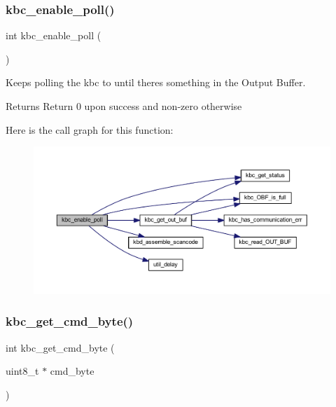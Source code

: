 \subsubsection{\texorpdfstring{kbc\+\_\+enable\+\_\+poll()}{kbc\_enable\_poll()}}
{\footnotesize\ttfamily int kbc\+\_\+enable\+\_\+poll (\begin{DoxyParamCaption}{ }\end{DoxyParamCaption})}



Keeps polling the kbc to until there\textquotesingle{}s something in the Output Buffer. 

\begin{DoxyReturn}{Returns}
Return 0 upon success and non-\/zero otherwise 
\end{DoxyReturn}
Here is the call graph for this function\+:\nopagebreak
\begin{figure}[H]
\begin{center}
\leavevmode
\includegraphics[width=350pt]{group__keyboard_ga71424d3c0eee59d712469efc0f137d60_cgraph}
\end{center}
\end{figure}
\mbox{\label{group__keyboard_ga3ab732a7b5d332ab6af5f82456c3528a}} 
\subsubsection{\texorpdfstring{kbc\+\_\+get\+\_\+cmd\+\_\+byte()}{kbc\_get\_cmd\_byte()}}
{\footnotesize\ttfamily int kbc\+\_\+get\+\_\+cmd\+\_\+byte (\begin{DoxyParamCaption}\item[{uint8\+\_\+t $\ast$}]{cmd\+\_\+byte }\end{DoxyParamCaption})}



